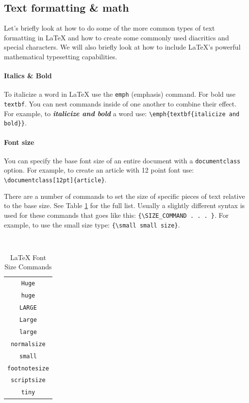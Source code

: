 \subsection{Text formatting \& math}

Let's briefly look at how to do some of the more common types of text formatting in LaTeX and how to create some commonly used diacritics and special characters. We will also briefly look at how to include LaTeX's powerful mathematical typesetting capabilities.

\paragraph{Italics \& Bold}

To italicize a word in LaTeX use the \texttt{emph} (emphasis) command. For bold use \texttt{textbf}. You can nest commands inside of one another to combine their effect. For example, to \emph{\textbf{italicize and bold}} a word use: \verb|\emph{textbf{italicize and bold}}|.

\paragraph{Font size}\label{FontSize}

You can specify the base font size of an entire document with a \texttt{documentclass} option. For example, to create an article with 12 point font use: \texttt{\textbackslash{}documentclass[12pt]\{article\}}.

There are a number of commands to set the size of specific pieces of text relative to the base size. See Table \ref{LaTeXFontSize} for the full list. Usually a slightly different syntax is used for these commands that goes like this: \verb|{\SIZE_COMMAND . . . }|. For example, to use the {\small small size} type: \verb|{\small small size}|.

\begin{table}
    \caption{LaTeX Font Size Commands}
    \label{LaTeXFontSize}
    \begin{center}
        \hline\\[0.25cm]
        \begin{tabular}{c}
            {\Huge \texttt{Huge}} \\
            {\huge \texttt{huge}} \\
            {\LARGE \texttt{LARGE}} \\
            {\Large \texttt{Large}} \\
            {\large \texttt{large}} \\
            {\normalsize \texttt{normalsize}} \\
            {\small \texttt{small}} \\
            {\footnotesize \texttt{footnotesize}} \\
            {\scriptsize \texttt{scriptsize}} \\
            {\tiny \texttt{tiny}} \\[0.25cm]
        \end{tabular}
        \hline
    \end{center}
\end{table}

